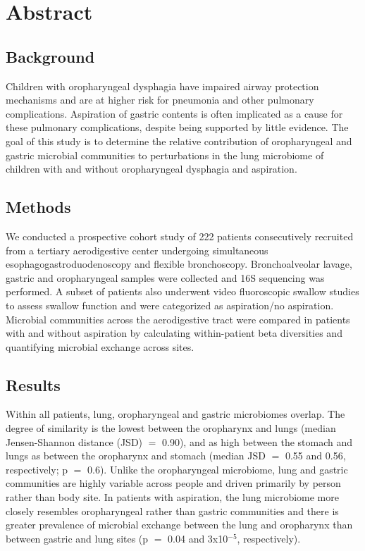 
\section*{Abstract}

\subsection*{Background}

Children with oropharyngeal dysphagia have impaired airway protection mechanisms and are at higher risk for pneumonia and other pulmonary complications.
Aspiration of gastric contents is often implicated as a cause for these pulmonary complications, despite being supported by little evidence.
The goal of this study is to determine the relative contribution of oropharyngeal and gastric microbial communities to perturbations in the lung microbiome of children with and without oropharyngeal dysphagia and aspiration.

\subsection*{Methods}

We conducted a prospective cohort study of 222 patients consecutively recruited from a tertiary aerodigestive center undergoing simultaneous esophagogastroduodenoscopy and flexible bronchoscopy.
Bronchoalveolar lavage, gastric and oropharyngeal samples were collected and 16S sequencing was performed.
A subset of patients also underwent video fluoroscopic swallow studies to assess swallow function and were categorized as aspiration/no aspiration.
Microbial communities across the aerodigestive tract were compared in patients with and without aspiration by calculating within-patient beta diversities and quantifying microbial exchange across sites.

\subsection*{Results}

Within all patients, lung, oropharyngeal and gastric microbiomes overlap.
The degree of similarity is the lowest between the oropharynx and lungs (median Jensen-Shannon distance (JSD) $=$ 0.90), and as high between the stomach and lungs as between the oropharynx and stomach (median JSD $=$ 0.55 and 0.56, respectively; p $=$ 0.6).
Unlike the oropharyngeal microbiome, lung and gastric communities are highly variable across people and driven primarily by person rather than body site.
In patients with aspiration, the lung microbiome more closely resembles oropharyngeal rather than gastric communities and there is greater prevalence of microbial exchange between the lung and oropharynx than between gastric and lung sites (p $=$ 0.04 and 3x10$^{-5}$, respectively).

